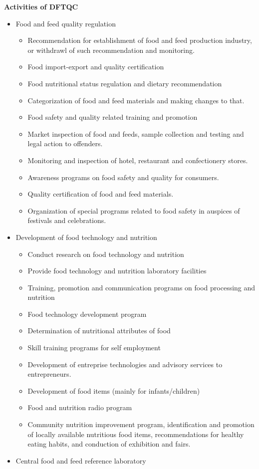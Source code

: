 \documentclass[
  openany]{book}
\providecommand{\tightlist}{%
  \setlength{\itemsep}{0pt}\setlength{\parskip}{0pt}}
\begin{document}
\textbf{Activities of DFTQC}

\begin{itemize}
\tightlist
\item
  Food and feed quality regulation

  \begin{itemize}
  \tightlist
  \item
    Recommendation for establishment of food and feed production industry, or withdrawl of such recommendation and monitoring.
  \item
    Food import-export and quality certification
  \item
    Food nutritional status regulation and dietary recommendation
  \item
    Categorization of food and feed materials and making changes to that.
  \item
    Food safety and quality related training and promotion
  \item
    Market inspection of food and feeds, sample collection and testing and legal action to offenders.
  \item
    Monitoring and inspection of hotel, restaurant and confectionery stores.
  \item
    Awareness programs on food safety and quality for consumers.
  \item
    Quality certification of food and feed materials.
  \item
    Organization of special programs related to food safety in auspices of festivals and celebrations.
  \end{itemize}
\item
  Development of food technology and nutrition

  \begin{itemize}
  \tightlist
  \item
    Conduct research on food technology and nutrition
  \item
    Provide food technology and nutrition laboratory facilities
  \item
    Training, promotion and communication programs on food processing and nutrition
  \item
    Food technology development program
  \item
    Determination of nutritional attributes of food
  \item
    Skill training programs for self employment
  \item
    Development of entreprise technologies and advisory services to entrepreneurs.
  \item
    Development of food items (mainly for infants/children)
  \item
    Food and nutrition radio program
  \item
    Community nutrition improvement program, identification and promotion of locally available nutritious food items, recommendations for healthy eating habits, and conduction of exhibition and fairs.
  \end{itemize}
\item
  Central food and feed reference laboratory


\end{itemize}
\end{document}

